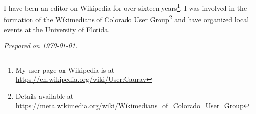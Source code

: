 \documentclass[12pt,letter]{article}
\begin{document}
I have been an editor on Wikipedia for over sixteen years\footnote{My user page on Wikipedia is at \url{https://en.wikipedia.org/wiki/User:Gaurav}}. I was involved in the formation of the Wikimedians of Colorado User Group\footnote{Details available at \url{https://meta.wikimedia.org/wiki/Wikimedians\_of\_Colorado\_User\_Group}} and have organized local events at the University of Florida.

\begin{center}


\small

\textit{Prepared on \today.}

\end{center}
\end{document}

